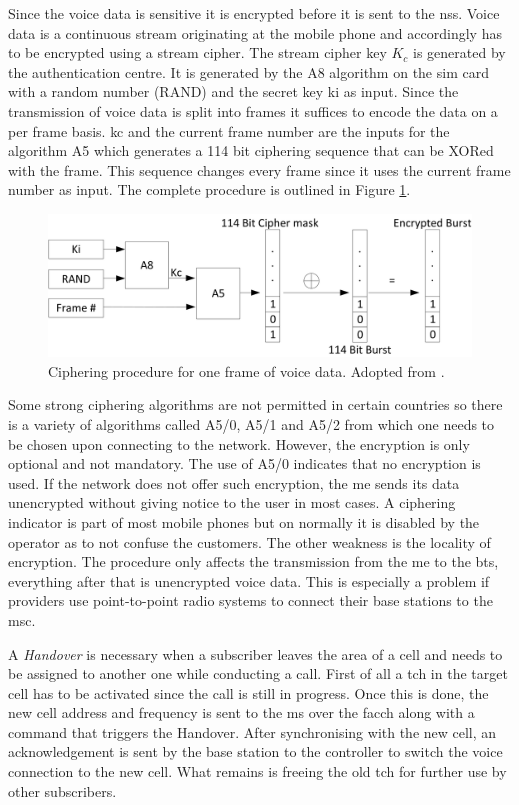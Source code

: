 Since the voice data is sensitive it is encrypted before it is sent to the \gls{nss}.
Voice data is a continuous stream originating at the mobile phone and accordingly has to be encrypted using a stream cipher.
The stream cipher key $K_c$ is generated by the authentication centre.
It is generated by the A8 algorithm on the \gls{sim} card with a random number (RAND) and the secret key \gls{ki} as input.
Since the transmission of voice data is split into frames it suffices to encode the data on a per frame basis.
\gls{kc} and the current frame number are the inputs for the algorithm A5 which generates a 114 bit ciphering sequence that can be XORed with the frame.
This sequence changes every frame since it uses the current frame number as input.
The complete procedure is outlined in Figure \ref{fig:cypher}.
\begin{figure}
\centering
\includegraphics{../Images/Cipher}
\caption{Ciphering procedure for one frame of voice data. Adopted from \cite{kommsys2006}.}
\label{fig:cypher}
\end{figure}
Some strong ciphering algorithms are not permitted in certain countries so there is a variety of algorithms called A5/0, A5/1 and A5/2 from which one needs to be chosen upon connecting to the network.
However, the encryption is only optional and not mandatory.
The use of A5/0 indicates that no encryption is used.
If the network does not offer such encryption, the \gls{me} sends its data unencrypted without giving notice to the user in most cases.
A ciphering indicator is part of most mobile phones but on normally it is disabled by the operator as to not confuse the customers.
The other weakness is the locality of encryption.
The procedure only affects the transmission from the \gls{me} to the \gls{bts}, everything after that is unencrypted voice data.
This is especially a problem if providers use point-to-point radio systems to connect their base stations to the \gls{msc}.

A \emph{Handover} is necessary when a subscriber leaves the area of a cell and needs to be assigned to another one while conducting a call.
First of all a \gls{tch} in the target cell has to be activated since the call is still in progress.
Once this is done, the new cell address and frequency is sent to the \gls{ms} over the \gls{facch} along with a command that triggers the Handover.
After synchronising with the new cell, an acknowledgement is sent by the base station to the controller to switch the voice connection to the new cell.
What remains is freeing the old \gls{tch} for further use by other subscribers.

